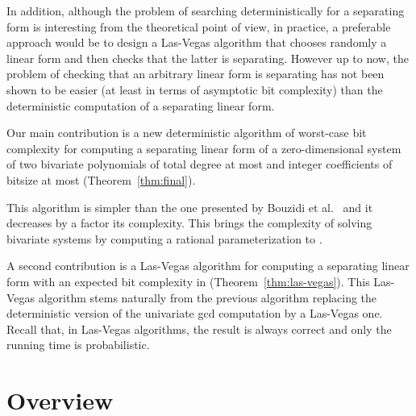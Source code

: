 \documentclass{sig-alternate}
\newcommand{\blue}[1]{\color{blue}#1\color{black}\xspace}
\renewcommand{\blue}[1]{#1\xspace}
\begin{document}
In addition, although the problem of searching deterministically for a separating form is interesting from the theoretical point of view, in practice, a preferable approach would be to design a Las-Vegas algorithm that chooses randomly  a linear form and then checks that the latter is separating. However up to now, the problem of checking that an arbitrary linear form is separating has not been shown to be easier (at least in terms of asymptotic bit complexity) than the deterministic computation of a separating linear form.


\smallskip

\quad
Our main contribution is a new deterministic algorithm of worst-case bit
complexity  for computing a separating linear form of a zero-dimensional system of two
bivariate polynomials of total degree at most  and integer coefficients of
bitsize at most  (Theorem~\ref{thm:final}). 

This algorithm is simpler than the one presented by Bouzidi et al.~\blue{\cite{bouzidiJSC2014a}} 
and it
decreases by a factor  its complexity. This 
brings the complexity of solving bivariate systems by computing a rational parameterization to . 

A second contribution is a Las-Vegas algorithm for computing a separating linear form with an expected bit complexity in  (Theorem~\ref{thm:las-vegas}). This Las-Vegas algorithm stems naturally from the previous algorithm replacing the deterministic version of the univariate gcd computation by a Las-Vegas one.
Recall that, \blue{in Las-Vegas algorithms, the result is always correct and only the running time is probabilistic.}


 \section{Overview}
 \label{sec:overview}
\end{document}
